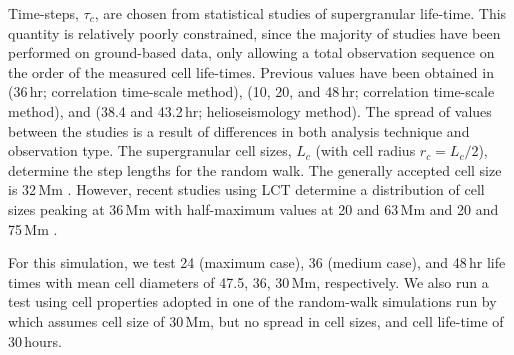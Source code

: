 Time-steps, $\tau_c$, are chosen from statistical studies of supergranular life-time. This quantity is relatively poorly constrained, since the majority of studies have been performed on ground-based data, only allowing a total observation sequence on the order of the measured cell life-times. Previous values have been obtained in \cite{Worden:1976} (36\,hr; correlation time-scale method), \cite{Wang:1989b} (10, 20, and 48\,hr; correlation time-scale method), and \cite{Hirzberger:2008} (38.4 and 43.2\,hr; helioseismology method). The spread of values between the studies is a result of differences in both analysis technique and observation type.
The supergranular cell sizes, $L_c$ (with cell radius $r_c = L_c/2$), determine the step lengths for the random walk. The generally accepted cell size is 32\,Mm \citep{Leighton:1962}. %
However, recent studies using \gls{LCT} determine a distribution of cell sizes peaking at 36\,Mm with half-maximum values at 20 and 63\,Mm \citep{Hathaway:2000,Hathaway:2002} and 20 and 75\,Mm \citep{Rieutord:2008}.

\begin{table}[!t]
\caption[A summary of random-walk simulation runs.]{A summary of random-walk simulation runs. The mean supergranular cell diameter ($r_c$) and life-time ($\tau_c$) for each run is given. The results of determining $D$ by fitting time series of particle $\langle R^2 \rangle$ and spatial distribution HWHM are given in the last two columns.}\label{table:simrandwalk}
\end{table}

For this simulation, we test 24 (maximum case), 36 (medium case), and 48\,hr life times with mean cell diameters of 47.5, 36, 30\,Mm, respectively. We also run a test using cell properties adopted in one of the random-walk simulations run by \citet{Simon:1995} which assumes cell size of 30\,Mm, but no spread in cell sizes, and cell life-time of 30\,hours. 

